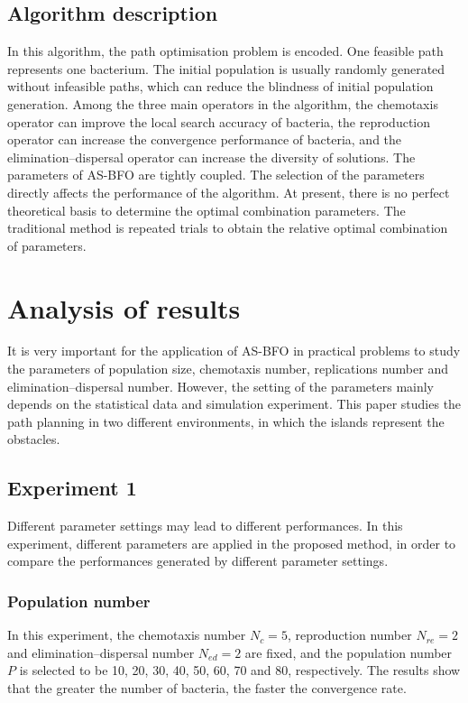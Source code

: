 \documentclass{PDS}%
\theoremstyle{definition}
\begin{document}
\subsection{Algorithm description}

In this algorithm, the path optimisation problem is encoded. One feasible path
represents one bacterium. The initial population is usually randomly generated without
infeasible paths, which can reduce the blindness of initial population generation. Among
the three main operators in the algorithm, the chemotaxis operator can improve the local
search accuracy of bacteria, the reproduction operator can increase the convergence
performance of bacteria, and the elimination--dispersal operator can increase the diversity of
solutions. The parameters of AS-BFO are tightly coupled. The selection of the parameters
directly affects the performance of the algorithm. At present, there is no perfect
theoretical basis to determine the optimal combination parameters. The traditional method
is repeated trials to obtain the relative optimal combination of parameters.


\section{Analysis of results}\label{sec4}

It is very important for the application of AS-BFO in practical problems to study the
parameters of population size, chemotaxis number, replications number and
elimination--dispersal number. However, the setting of the parameters mainly depends on
the statistical data and simulation experiment. This paper studies the path planning in
two different environments, in which the islands represent the obstacles.

\subsection{Experiment 1}

Different parameter settings may lead to different performances. In this experiment,
different parameters are applied in the proposed method, in order to compare the
performances generated by different parameter settings.

\subsubsection{Population number}

In this experiment, the chemotaxis number $N_c=5$, reproduction number $N_{re}=2$ and
elimination--dispersal number $N_{ed}=2$ are fixed, and the population number $P$ is selected
to be 10, 20, 30, 40, 50, 60, 70 and 80, respectively. The results show that the greater the number of bacteria, the faster the convergence rate.
\end{document}
